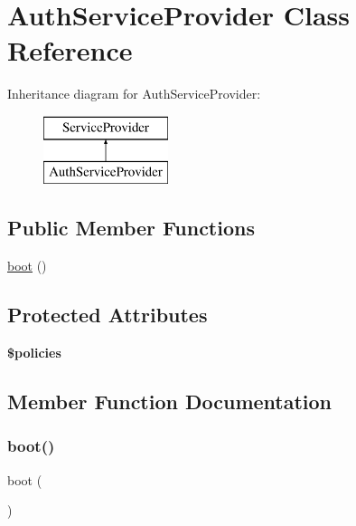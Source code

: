 \hypertarget{class_app_1_1_providers_1_1_auth_service_provider}{}\section{Auth\+Service\+Provider Class Reference}
\label{class_app_1_1_providers_1_1_auth_service_provider}
Inheritance diagram for Auth\+Service\+Provider\+:\begin{figure}[H]
\begin{center}
\leavevmode
\includegraphics[height=2.000000cm]{class_app_1_1_providers_1_1_auth_service_provider}
\end{center}
\end{figure}
\subsection*{Public Member Functions}
\begin{DoxyCompactItemize}
\item 
\mbox{\hyperlink{class_app_1_1_providers_1_1_auth_service_provider_a8814ea4b5beba763c570b4818980814e}{boot}} ()
\end{DoxyCompactItemize}
\subsection*{Protected Attributes}
\begin{DoxyCompactItemize}
\item 
{\bfseries \$policies}
\end{DoxyCompactItemize}


\subsection{Member Function Documentation}
\mbox{\label{class_app_1_1_providers_1_1_auth_service_provider_a8814ea4b5beba763c570b4818980814e}} 
\subsubsection{\texorpdfstring{boot()}{boot()}}
{\footnotesize\ttfamily boot (\begin{DoxyParamCaption}{ }\end{DoxyParamCaption})}

